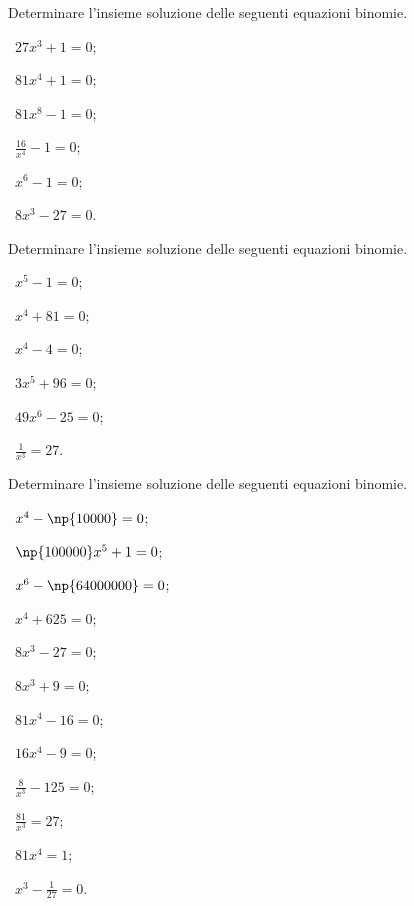 \begin{esercizio}[\Ast]
 \label{ese:5.13}
Determinare l'insieme soluzione delle seguenti equazioni binomie.
\begin{multicols}{3}
 \begin{enumeratea}
 \item~$27x^3+1=0$;
 \item~$81x^4+1=0$;
 \item~$81x^8-1=0$;
 \item~$\frac{16}{x^4}-1=0$;
 \item~$x^6-1=0$;
 \item~$8x^3-27=0$.
 \end{enumeratea}
 \end{multicols}
\end{esercizio}

\begin{esercizio}[\Ast]
 \label{ese:5.14}
Determinare l'insieme soluzione delle seguenti equazioni binomie.
\begin{multicols}{3}
 \begin{enumeratea}
 \item~$x^5-1=0$;
 \item~$x^4+81=0$;
 \item~$x^4-4=0$;
 \item~$3x^5+96=0$;
 \item~$49x^6-25=0$;
 \item~$\frac 1{x^3}=27$.
 \end{enumeratea}
 \end{multicols}
\end{esercizio}

\pagebreak
\begin{esercizio}[\Ast]
 \label{ese:5.15}
Determinare l'insieme soluzione delle seguenti equazioni binomie.
\begin{multicols}{3}
 \begin{enumeratea}
 \item~$x^4-\np{10000}=0$;
 \item~$\np{100000}x^5+1=0$;
 \item~$x^6-\np{64000000}=0$;
 \item~$x^4+625=0$;
 \item~$8x^3-27=0$;
 \item~$8x^3+9=0$;
 \item~$81x^4-16=0$;
 \item~$16x^4-9=0$;
 \item~$\frac 8{x^3}-125=0$;
 \item~$\frac{81}{x^3}=27$;
 \item~$81x^4=1$;
 \item~$x^3-\frac 1{27}=0$.
 \end{enumeratea}
 \end{multicols}
\end{esercizio}

